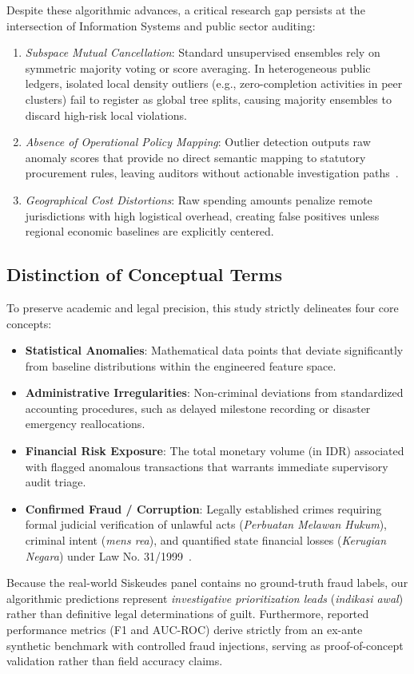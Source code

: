 \documentclass[conference]{IEEEtran}
\begin{document}
Despite these algorithmic advances, a critical research gap persists at the intersection of Information Systems and public sector auditing:
\begin{enumerate}
    \item \textit{Subspace Mutual Cancellation}: Standard unsupervised ensembles rely on symmetric majority voting or score averaging. In heterogeneous public ledgers, isolated local density outliers (e.g., zero-completion activities in peer clusters) fail to register as global tree splits, causing majority ensembles to discard high-risk local violations.
    \item \textit{Absence of Operational Policy Mapping}: Outlier detection outputs raw anomaly scores that provide no direct semantic mapping to statutory procurement rules, leaving auditors without actionable investigation paths~\cite{ref_almaqtari2024,ref_vukovic2025}.
    \item \textit{Geographical Cost Distortions}: Raw spending amounts penalize remote jurisdictions with high logistical overhead, creating false positives unless regional economic baselines are explicitly centered.
\end{enumerate}

\subsection{Distinction of Conceptual Terms}

To preserve academic and legal precision, this study strictly delineates four core concepts:
\begin{itemize}
    \item \textbf{Statistical Anomalies}: Mathematical data points that deviate significantly from baseline distributions within the engineered feature space.
    \item \textbf{Administrative Irregularities}: Non-criminal deviations from standardized accounting procedures, such as delayed milestone recording or disaster emergency reallocations.
    \item \textbf{Financial Risk Exposure}: The total monetary volume (in IDR) associated with flagged anomalous transactions that warrants immediate supervisory audit triage.
    \item \textbf{Confirmed Fraud / Corruption}: Legally established crimes requiring formal judicial verification of unlawful acts (\textit{Perbuatan Melawan Hukum}), criminal intent (\textit{mens rea}), and quantified state financial losses (\textit{Kerugian Negara}) under Law No. 31/1999~\cite{ref34}.
\end{itemize}
Because the real-world Siskeudes panel contains no ground-truth fraud labels, our algorithmic predictions represent \textit{investigative prioritization leads} (\textit{indikasi awal}) rather than definitive legal determinations of guilt. Furthermore, reported performance metrics (F1 and AUC-ROC) derive strictly from an ex-ante synthetic benchmark with controlled fraud injections, serving as proof-of-concept validation rather than field accuracy claims.
\end{document}
